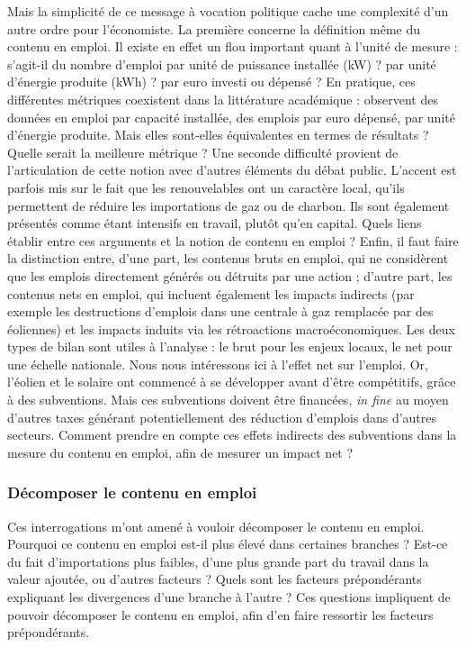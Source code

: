 Mais la simplicité de ce message à vocation politique cache une complexité d’un autre ordre pour l’économiste. 
La première concerne la définition même du contenu en emploi. Il existe en effet un flou important quant à l’unité de mesure : s’agit-il du nombre d’emploi par unité de puissance installée (kW) ? par unité d’énergie produite (kWh) ? par euro investi ou dépensé ? En pratique, ces différentes métriques coexistent dans la littérature académique : \citet{Cameron2015} observent des données en emploi par capacité installée, \citet{Quirion2013} des emplois par euro dépensé, \citet{Wei2010} par unité d’énergie produite. Mais elles sont-elles équivalentes en termes de résultats ? Quelle serait la meilleure métrique ?
Une seconde difficulté provient de l’articulation de cette notion avec d’autres éléments du débat public. L’accent est parfois mis sur le fait que les renouvelables ont un caractère local, qu’ils permettent de réduire les importations de gaz ou de charbon. Ils sont également présentés comme étant intensifs en travail, plutôt qu’en capital. Quels liens établir entre ces arguments et la notion de contenu en emploi ?
Enfin, il faut faire la distinction entre, d'une part, les contenus bruts en emploi, qui ne considèrent que les emplois directement générés ou détruits par une action ; d'autre part, les contenus nets en emploi, qui incluent également les impacts indirects (par exemple les destructions d'emplois dans une centrale à gaz remplacée par des éoliennes) et les impacts induits via les rétroactions macroéconomiques. 
Les deux types de bilan sont utiles à l'analyse : le brut pour les enjeux locaux, le net pour une échelle nationale. Nous nous intéressons ici à l’effet net sur l’emploi. Or, l'éolien et le solaire ont commencé à se développer avant d’être compétitifs, grâce à des subventions. Mais ces subventions doivent être financées, \textit{in fine} au moyen d’autres taxes générant potentiellement des réduction d’emplois dans d’autres secteurs. Comment prendre en compte ces effets indirects des subventions dans la mesure du contenu en emploi, afin de mesurer un impact net ?

\subsubsection{Décomposer le contenu en emploi}

Ces interrogations m’ont amené à vouloir décomposer le contenu en emploi. Pourquoi ce contenu en emploi est-il plus élevé dans certaines branches ? Est-ce du fait d’importations plus faibles, d’une plus grande part du travail dans la valeur ajoutée, ou d’autres facteurs ? Quels sont les facteurs prépondérants expliquant les divergences d’une branche à l’autre ?
Ces questions impliquent de pouvoir décomposer le contenu en emploi, afin d'en faire ressortir les facteurs prépondérants.

